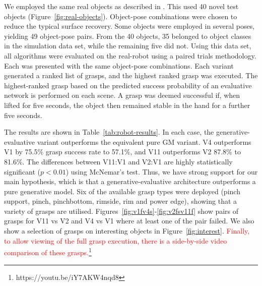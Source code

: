 We employed the same real objects as described in \cite{kopicki2019ijrr}. This used 40 novel test objects (Figure~\ref{fig:real-objects}). Object-pose combinations were chosen to reduce the typical surface recovery. Some objects were employed in several poses, yielding 49 object-pose pairs. From the 40 objects, 35 belonged to object classes in the simulation data set, while the remaining five did not. Using this data set, all algorithms were evaluated on the real-robot using a paired trials methodology. Each was presented with the same object-pose combinations. Each variant generated a ranked list of grasps, and the highest ranked grasp was executed. The highest-ranked grasp based on the predicted success probability of an evaluative network is performed on each scene. A grasp was deemed successful if, when lifted for five seconds, the object then remained stable in the hand for a further five seconds.

The results are shown in Table~\ref{tab:robot-results}. In each case, the generative-evaluative variant outperforms the equivalent pure GM variant. V4 outperforms V1 by 75.5\% grasp success rate to 57.1\%, and V11 outperforms V2 87.8\% to 81.6\%. The differences between V11:V1 and V2:V1 are highly statistically significant ($p<0.01$) using McNemar's test. Thus, we have strong support for our main hypothesis, which is that a generative-evaluative architecture outperforms a pure generative model. Six of the available grasp types were deployed (pinch support, pinch, pinchbottom, rimside, rim and power edge), showing that a variety of grasps are utilised. Figures~\ref{fig:v1fv4s}-\ref{fig:v2fsv11f} show pairs of grasps for V11 vs V2  and V4 vs V1 where at least one of the pair failed. We also show a selection of grasps on interesting objects in Figure~\ref{fig:interest}. \textcolor{red}{Finally, to allow viewing of the full grasp execution, there is a side-by-side video comparison of these grasps.\footnote{https://youtu.be/iY7AKW4nqd8}}

